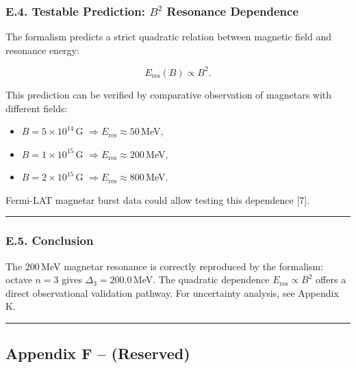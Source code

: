 \documentclass[11pt]{article}
\providecommand{\tightlist}{\setlength{\itemsep}{2pt}\setlength{\parskip}{6pt}}
\providecommand{\tightlist}{%
  \setlength{\itemsep}{2pt}\setlength{\parskip}{6pt}
}
\begin{document}
\hypertarget{e.4.-testable-prediction-b2-resonance-dependence}{%
\subsubsection{\texorpdfstring{E.4. Testable Prediction: \(B^2\)
Resonance
Dependence}{E.4. Testable Prediction: B\^{}2 Resonance Dependence}}\label{e.4.-testable-prediction-b2-resonance-dependence}}

The formalism predicts a strict quadratic relation between magnetic
field and resonance energy:

\[
E_{\text{res}}(B) \propto B^2.
\]

This prediction can be verified by comparative observation of magnetars
with different fields:

\begin{itemize}
\tightlist
\item
  \(B = 5 \times 10^{14}\)\,G
  \(\Rightarrow E_{\text{res}} \approx 50\)\,MeV,
\item
  \(B = 1 \times 10^{15}\)\,G
  \(\Rightarrow E_{\text{res}} \approx 200\)\,MeV,
\item
  \(B = 2 \times 10^{15}\)\,G
  \(\Rightarrow E_{\text{res}} \approx 800\)\,MeV.
\end{itemize}

Fermi-LAT magnetar burst data could allow testing this dependence
{[}7{]}.

\begin{center}\rule{0.5\linewidth}{0.5pt}\end{center}

\hypertarget{e.5.-conclusion}{%
\subsubsection{E.5. Conclusion}\label{e.5.-conclusion}}

The 200\,MeV magnetar resonance is correctly reproduced by the
formalism: octave \(n=3\) gives \(\Delta_3 = 200.0\)\,MeV. The quadratic
dependence \(E_{\text{res}} \propto B^2\) offers a direct observational
validation pathway. For uncertainty analysis, see Appendix K.

\begin{center}\rule{0.5\linewidth}{0.5pt}\end{center}

\hypertarget{appendix-f-reserved}{%
\subsection{Appendix F -- (Reserved)}\label{appendix-f-reserved}}
\end{document}
